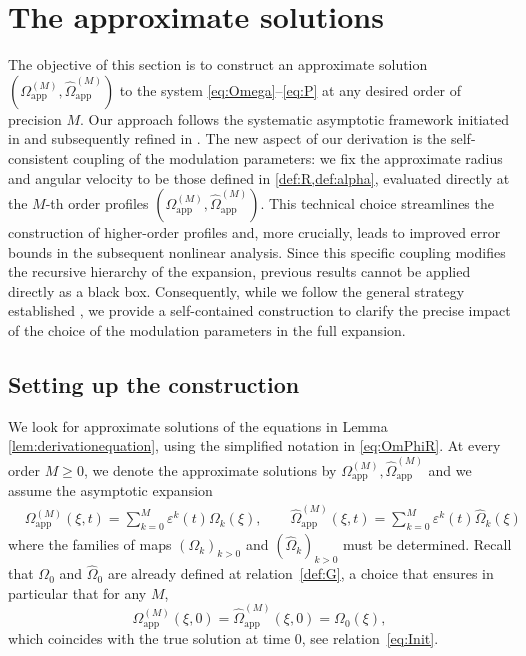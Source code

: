 \documentclass[11pt,reqno,a4paper]{amsart}
\def\eps{\varepsilon}
\newcommand{\1}{\mathbbm{1}}
\theoremstyle{definition}
\theoremstyle{definition}
\numberwithin{equation}{section}
\newcommand{\Mapp}[2]{#1^{(#2)}_\mathrm{app}}
\begin{document}


\section{The approximate solutions}\label{sec:App}


The objective of this section is to construct an approximate solution $(\Mapp{\Omega}{M},\Mapp{\widehat{\Omega}}{M})$ to the system \cref{eq:Omega}--\cref{eq:P} at any desired order of precision $M$. Our approach follows the systematic asymptotic framework initiated in \cite{Gallay2011} and subsequently refined in \cite{GaSring,dolce2024long,donati2025fast,zhang2025long}. The new aspect of our derivation is the self-consistent coupling of the modulation parameters: we fix the approximate radius and angular velocity to be those defined in \cref{def:R,def:alpha}, evaluated directly at the $M$-th order profiles $(\Mapp{\Omega}{M},\Mapp{\widehat{\Omega}}{M})$. This technical choice streamlines the construction of higher-order profiles and, more crucially, leads to improved error bounds in the subsequent nonlinear analysis. Since this specific coupling modifies the recursive hierarchy of the expansion, previous results cannot be applied directly as a black box. Consequently, while we follow the general strategy established \cite{dolce2024long}, we provide a self-contained construction to clarify the precise impact of the choice of the modulation parameters in the full expansion.




\subsection{Setting up the construction}



We look for approximate solutions of the equations in Lemma \ref{lem:derivationequation}, using the simplified notation in \cref{eq:OmPhiR}. At every order $M \ge 0$, we denote the approximate solutions by $\Mapp{\Omega}{M},\Mapp{\widehat{\Omega}}{M}$ and we assume the asymptotic expansion 
\begin{align}
    \label{def:Omapp}&\Mapp{\Omega}{M}(\xi,t)=\sum_{k=0}^M\eps^k(t)\Omega_{k}(\xi), \qquad \Mapp{\widehat{\Omega}}{M}(\xi,t)=\sum_{k=0}^M\eps^k(t)\widehat{\Omega}_{k}(\xi)
\end{align}
where the families of maps $(\Omega_k)_{k> 0}$ and $(\widehat{\Omega}_k)_{k> 0}$ must be determined. Recall that $\Omega_0$ and $\widehat{\Omega}_0$ are already defined at relation~\cref{def:G}, a choice that ensures in particular that for any $M$, $$\Mapp{\Omega}{M}(\xi,0) = \Mapp{\widehat{\Omega}}{M}(\xi,0) = \Omega_0(\xi),$$ which coincides with the true solution at time 0, see relation~\cref{eq:Init}.
\end{document}
